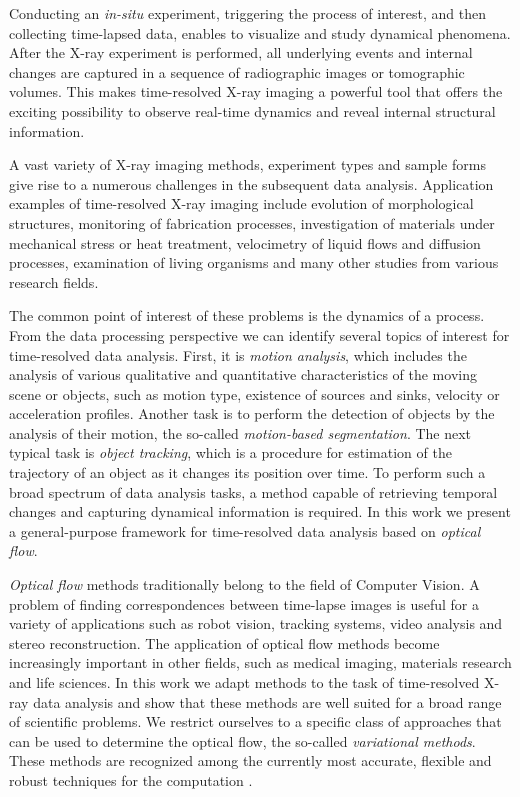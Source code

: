 Conducting an \textit{in-situ} experiment, triggering the process of interest, and then collecting time-lapsed data, enables to visualize and study dynamical phenomena. After the X-ray experiment is performed, all underlying events and internal changes are captured in a sequence of radiographic images or tomographic volumes. This makes time-resolved X-ray imaging a powerful tool that offers the exciting possibility to observe real-time dynamics and reveal internal structural information.


A vast variety of X-ray imaging methods, experiment types and sample forms give rise to a numerous challenges in the subsequent data analysis. Application examples of time-resolved X-ray imaging include evolution of morphological structures, monitoring of fabrication processes, investigation of materials under mechanical stress or heat treatment, velocimetry of liquid flows and diffusion processes, examination of living organisms and many other studies from various research fields. 

The common point of interest of these problems is the dynamics of a process. From the data processing perspective we can identify several topics of interest for time-resolved data analysis. First, it is \textit{motion analysis}, which includes the analysis of various qualitative and quantitative characteristics of the moving scene or objects, such as motion type, existence of sources and sinks, velocity or acceleration profiles. Another task is to perform the detection of objects by the analysis of their motion, the so-called \textit{motion-based segmentation}. The next typical task is \textit{object tracking}, which is a procedure for estimation of the trajectory of an object as it changes its position over time. To perform such a broad spectrum of data analysis tasks, a method capable of retrieving temporal changes and capturing dynamical information is required. In this work we present a general-purpose framework for time-resolved data analysis based on \textit{optical flow}. 
 

\textit{Optical flow} methods traditionally belong to the field of Computer Vision. A problem of finding correspondences between time-lapse images is useful for a variety of applications such as robot vision, tracking systems, video analysis and stereo reconstruction. The application of optical flow methods become increasingly important in other fields, such as medical imaging, materials research and life sciences. 
In this work we adapt \opticalflow methods to the task of time-resolved X-ray data analysis and show that these methods are well suited for a broad range of scientific problems. We restrict ourselves to a specific class of approaches that can be used to determine the optical flow, the so-called \textit{variational methods}. These methods are recognized among the currently most accurate, flexible and robust techniques for the \opticalflow computation \cite{Middl, Sun14}. 



